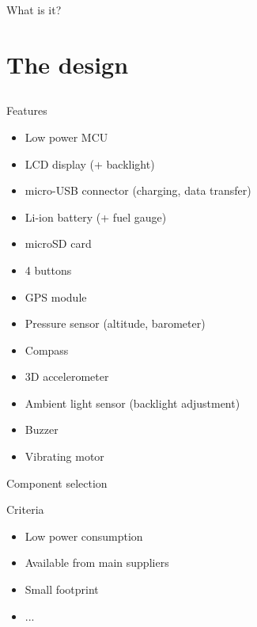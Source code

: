 \documentclass[compress,red]{beamer}
\begin{document}
\begin{frame}{What is it?}


\end{frame}


\section{The design}

\subsection*{} %

\begin{frame}{Features}

  \begin{block}{}
    \begin{itemize}
    \item Low power MCU
    \item LCD display (+ backlight)
    \item micro-USB connector (charging, data transfer)
    \item Li-ion battery (+ fuel gauge)
    \item microSD card
    \item 4 buttons
    \item GPS module
    \item Pressure sensor (altitude, barometer)
    \item Compass
    \item 3D accelerometer
    \item Ambient light sensor (backlight adjustment)
    \item Buzzer
    \item Vibrating motor
    \end{itemize}
  \end{block}

  \note[item]{}

\end{frame}

\begin{frame}{Component selection}

  \begin{block}{Criteria}
    \begin{itemize}
    \item Low power consumption
    \item Available from main suppliers
    \item Small footprint
    \item ...
    \end{itemize}
  \end{block}

  \note[item]{}

\end{frame}
\end{document}
